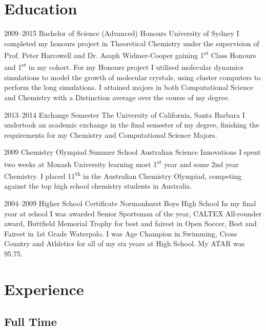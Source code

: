 



\makecvtitle

\section{Education}

\cventry
{2009--2015}
{Bachelor of Science (Advanced) Honours}
{University of Sydney}{}{}
{I completed my honours project in Theoretical Chemistry under the supervision of Prof. Peter Harrowell and Dr. Asaph Widmer-Cooper gaining 1\textsuperscript{st} Class Honours and 1\textsuperscript{st} in my cohort. For my Honours project I utilised molecular dynamics simulations to model the growth of molecular crystals, using cluster computers to perform the long simulations. I attained majors in both Computational Science and Chemistry with a Distinction average over the course of my degree.
}

\cventry
{2013--2014}
{Exchange Semester}
{The University of California, Santa Barbara}{}{}
{I undertook an academic exchange in the final semester of my degree, finishing the requirements for my Chemistry and Computational Science Majors.}

\cventry
{2009}
{Chemistry Olympiad Summer School}
{Australian Science Innovations}{}{}
{I spent two weeks at Monash University learning most 1\textsuperscript{st} year and some 2nd year Chemistry. I placed 11\textsuperscript{th} in the Australian Chemistry Olympiad, competing against the top high school chemistry students in Australia.}

\cventry
{2004--2009}
{Higher School Certificate}
{Normanhurst Boys High School}{}{}
{In my final year at school I was awarded Senior Sportsman of the year, CALTEX All-rounder award, Buttfield Memorial Trophy for best and fairest in Open Soccer, Best and Fairest in 1st Grade Waterpolo. I was Age Champion in Swimming, Cross Country and Athletics for all of my six years at High School. My ATAR was 95.75.
}

\nocite{*}
\printbibliography[title={Publications}]

\section{Experience}

\subsection{Full Time}

